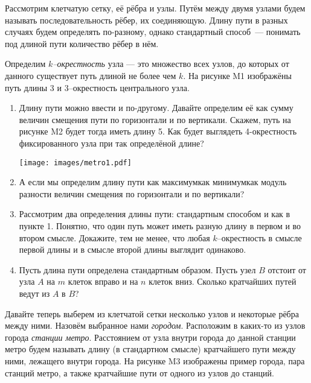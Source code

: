 \documentclass[10pt]{scrbook} \usepackage{modules/nonstahp_book}
\begin{document}

\noindent Рассмотрим клетчатую сетку, её рёбра и узлы. Путём между двумя узлами будем называть последовательность рёбер, их соединяющую. Длину пути в разных случаях будем определять по-разному, однако стандартный способ~— понимать под длиной пути количество рёбер в нём.

\ms Определим {\it $k$--окрестность} узла — это множество всех узлов, до которых от данного существует путь длиной не более чем $k$. На рисунке M1 изображёны путь длины 3 и 3--окрестность центрального узла.

\begin{enumerate}

\item Длину пути можно ввести и по-другому. Давайте определим её как сумму величин смещения пути по горизонтали и по вертикали. Скажем, путь на рисунке M2 будет тогда иметь длину 5. Как будет выглядеть 4-окрестность фиксированного узла при так определёной длине?

\vspace{-0.3cm}
\begin{center}
\texttt{[image: images/metro1.pdf]}
\end{center} \vspace{-0.7cm}

\item А если мы определим длину пути как максимум\scolon как минимум\scolon как модуль разности величин смещения по горизонтали и по вертикали?

\item Рассмотрим два определения длины пути: стандартным способом и как в пункте 1. Понятно, что один путь может иметь разную длину в первом и во втором смысле. Докажите, тем не менее, что любая $k$--окрестность в смысле первой длины и в смысле второй длины выглядит одинаково.

\item Пусть длина пути определена стандартным образом. Пусть узел $B$ отстоит от узла $A$ на $m$ клеток вправо и на $n$ клеток вниз. Сколько кратчайших путей ведут из $A$ в $B$?

\end{enumerate}

\noindent Давайте теперь выберем из клетчатой сетки несколько узлов и некоторые рёбра между ними. Назовём выбранное нами {\it городом}. Расположим в каких-то из узлов города {\it станции метро}. Расстоянием от узла внутри города до данной станции метро будем называть длину (в стандартном смысле) кратчайшего пути между ними, лежащего внутри города. На рисунке M3 изображены пример города, пара станций метро, а также кратчайшие пути от одного из узлов до станций.
\end{document}
